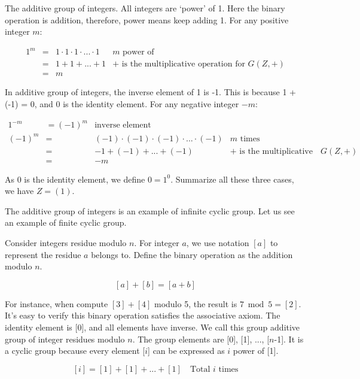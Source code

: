 \documentclass{article}
\begin{document}
\begin{example}
The additive group of integers. All integers are `power' of 1. Here the binary operation is addition, therefore, power means keep adding 1. For any positive integer $m$:

\[
\begin{array}{rcll}
1^m & = & 1 \cdot 1 \cdot 1 \cdot ... \cdot 1 & \text{$m$ power of} \\
    & = & 1 + 1 + ... + 1 & \text{+ is the multiplicative operation for $G(Z, +)$} \\
    & = & m &
\end{array}
\]

In additive group of integers, the inverse element of 1 is -1. This is because 1 + (-1) = 0, and 0 is the identity element. For any negative integer $-m$:

\[
\begin{array}{rcll}
1^{-m} & = (-1)^m & \text{inverse element} & \\
(-1)^m & = & (-1) \cdot (-1) \cdot (-1) \cdot ... \cdot (-1) & \text{$m$ times} \\
       & = & -1 + (-1) + ... + (-1) & \text{+ is the multiplicative operation for $G(Z, +)$} \\
       & = & -m &
\end{array}
\]

As 0 is the identity element, we define $0 = 1^0$. Summarize all these three cases, we have $Z = (1)$.
\end{example}

The additive group of integers is an example of infinite cyclic group. Let us see an example of finite cyclic group.

\begin{example}
Consider integers residue modulo $n$. For integer $a$, we use notation $[a]$ to represent the residue $a$ belongs to. Define the binary operation as the addition modulo $n$.

\[
[a] + [b] = [a + b]
\]

For instance, when compute $[3] + [4]$ modulo 5, the result is $7 \bmod 5 = [2]$. It's easy to verify this binary operation satisfies the associative axiom. The identity element is [0], and all elements have inverse. We call this group additive group of integer residues modulo $n$. The group elements are [0], [1], ..., [$n$-1]. It is a cyclic group because every element [$i$] can be expressed as $i$ power of [1].

\[
[i] = [1] + [1] + ... + [1] \quad \text{Total $i$ times}
\]
\end{example}
\end{document}
